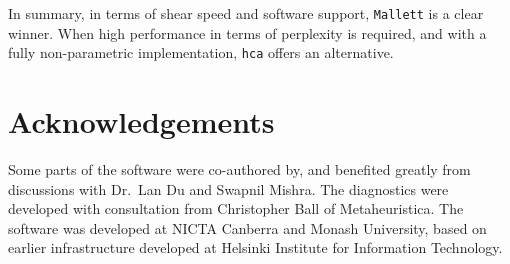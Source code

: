 \documentclass[twoside,11pt]{article}
\begin{document}
In summary, in terms of shear speed and software support,
{\tt Mallett} is a clear winner.  When high performance
in terms of perplexity is required, and
with a fully non-parametric implementation,
{\tt hca} offers an alternative.

\section*{Acknowledgements}
{Some parts of the software were co-authored by, and benefited greatly
  from discussions with Dr.\ Lan Du and Swapnil Mishra.
  The diagnostics were developed with consultation from Christopher Ball of
  Metaheuristica.
  The software was developed at NICTA Canberra and Monash University,
  based on earlier infrastructure developed at
  Helsinki Institute for Information Technology.
}



\end{document}
